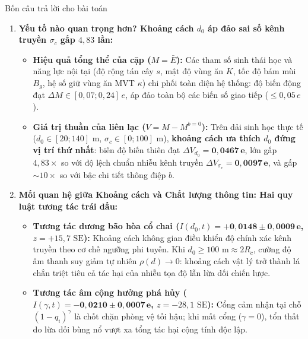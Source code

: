 \documentclass[11pt,a4paper]{report}
\begin{document}
\begin{ketqua}{Bốn câu trả lời cho bài toán}
\begin{enumerate}[leftmargin=1.5em,itemsep=3pt]
  \item \textbf{Yếu tố nào quan trọng hơn? Khoảng cách $d_0$ áp đảo sai số kênh truyền $\sigma_c$ gấp $4{,}83$ lần:}
  \begin{itemize}
    \item \textbf{Hiệu quả tổng thể của cặp ($M = \bar{E}$):} Các tham số sinh thái học và năng lực nội tại (độ rộng tán cây $s$, mật độ vùng ăn $K$, tốc độ bám mùi $B_g$, hệ số giữ vùng ăn MVT $\kappa$) chi phối toàn diện hệ thống: độ biến động đạt $\Delta M \in [0{,}07; 0{,}24]\,e$, áp đảo toàn bộ các biến số giao tiếp ($\le 0{,}05\,e$).
    \item \textbf{Giá trị thuần của liên lạc ($V = M - M^{b=0}$):} Trên dải sinh học thực tế ($d_0 \in [20; 140]\text{ m}$, $\sigma_c \in [0; 100]\text{ m}$), \textbf{khoảng cách ưa thích $d_0$ đứng vị trí thứ nhất}: biên độ biến thiên đạt $\Delta V_{d_0} = \mathbf{0{,}0467\,e}$, lớn gấp \textbf{$4{,}83\times$} so với độ lệch chuẩn nhiễu kênh truyền $\Delta V_{\sigma_c} = \mathbf{0{,}0097\,e}$, và gấp $\sim 10\times$ so với bậc chi tiết thông điệp $b$.
  \end{itemize}

  \item \textbf{Mối quan hệ giữa Khoảng cách và Chất lượng thông tin: Hai quy luật tương tác trái dấu:}
  \begin{itemize}
    \item \textbf{Tương tác dương bão hòa cổ chai ($I(d_0, t) = \mathbf{+0{,}0148 \pm 0{,}0009\,e}$, $z = +15{,}7\text{ SE}$):} Khoảng cách không gian điều khiển độ chính xác kênh truyền theo cơ chế ngưỡng phi tuyến. Khi $d_0 \ge 100\text{ m} \approx 2R_c$, cường độ âm thanh suy giảm tự nhiên $\rho(d) \to 0$: khoảng cách vật lý trở thành lá chắn triệt tiêu cả tác hại của nhiễu tọa độ lẫn lừa dối chiến lược.
    \item \textbf{Tương tác âm cộng hưởng phá hủy ($I(\gamma, t) = \mathbf{-0{,}0210 \pm 0{,}0007\,e}$, $z = -28{,}1\text{ SE}$):} Cổng cảm nhận tại chỗ $(1-q_i)^\gamma$ là chốt chặn phòng vệ tối hậu; khi mất cổng ($\gamma = 0$), tổn thất do lừa dối bùng nổ vượt xa tổng tác hại cộng tính độc lập.
  \end{itemize}


\end{enumerate}
\end{ketqua}
\end{document}
